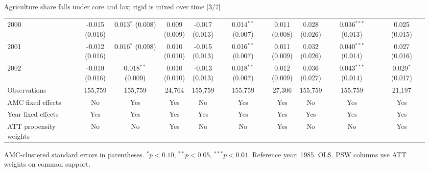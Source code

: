 \documentclass[aspectratio=169]{beamer}
\begin{document}
\begin{frame}{Agriculture share falls under core and lax; rigid is mixed over time [3/7]}
{\begin{tabular}{@{}l*{9}{c}@{}}
2000 & \shortstack{-0.015\\(0.016)} & \shortstack{0.013$^{*}$\\(0.008)} & \shortstack{0.009\\(0.009)} & \shortstack{-0.017\\(0.013)} & \shortstack{0.014$^{**}$\\(0.007)} & \shortstack{0.011\\(0.008)} & \shortstack{0.028\\(0.026)} & \shortstack{0.036$^{***}$\\(0.013)} & \shortstack{0.025\\(0.015)} \\
2001 & \shortstack{-0.012\\(0.016)} & \shortstack{0.016$^{*}$\\(0.008)} & \shortstack{0.010\\(0.010)} & \shortstack{-0.015\\(0.013)} & \shortstack{0.016$^{**}$\\(0.007)} & \shortstack{0.011\\(0.009)} & \shortstack{0.032\\(0.026)} & \shortstack{0.040$^{***}$\\(0.014)} & \shortstack{0.027\\(0.016)} \\
2002 & \shortstack{-0.010\\(0.016)} & \shortstack{0.018$^{**}$\\(0.009)} & \shortstack{0.010\\(0.010)} & \shortstack{-0.013\\(0.013)} & \shortstack{0.018$^{**}$\\(0.007)} & \shortstack{0.012\\(0.009)} & \shortstack{0.036\\(0.027)} & \shortstack{0.043$^{***}$\\(0.014)} & \shortstack{0.029$^{*}$\\(0.017)} \\
\midrule
Observations & 155,759 & 155,759 & 24,764 & 155,759 & 155,759 & 27,306 & 155,759 & 155,759 & 21,197 \\
AMC fixed effects & No & Yes & Yes & No & Yes & Yes & No & Yes & Yes \\
Year fixed effects & Yes & Yes & Yes & Yes & Yes & Yes & Yes & Yes & Yes \\
ATT propensity weights & No & No & Yes & No & No & Yes & No & No & Yes \\
\bottomrule
\end{tabular}%
}
\vspace{0.1em}
{\tiny\color{ZMidGray} AMC-clustered standard errors in parentheses. $^{*}p<0.10$, $^{**}p<0.05$, $^{***}p<0.01$. Reference year: 1985. OLS. PSW columns use ATT weights on common support.}
\end{frame}
\end{document}
